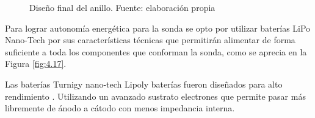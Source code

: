 \begin{itemize}
    \begin{figure}[ht]
    \centering
    \caption{Dise\~no final del anillo. Fuente: elaboración propia}
    \label{fig:Anillo2019}
    \end{figure}
\end{itemize}

Para lograr autonom\'ia energ\'etica para la sonda se opto por utilizar bater\'ias LiPo Nano-Tech por sus caracter\'isticas t\'ecnicas que permitir\'an alimentar de forma suficiente a toda los componentes que conforman la sonda, como se aprecia en la Figura \ref{fig:4.17}. 

Las bater\'ias Turnigy nano-tech Lipoly bater\'ias fueron dise\~nados para alto rendimiento . Utilizando un avanzado sustrato electrones que permite pasar m\'as libremente de \'anodo a c\'atodo con menos impedancia interna.
 
